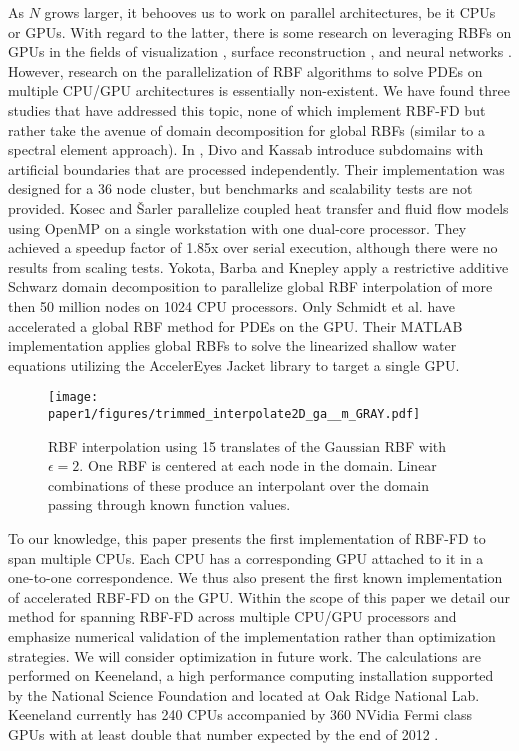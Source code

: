 As $N$ grows larger, it behooves us to work on parallel architectures, be it CPUs or GPUs. With regard to the latter, there is some research on leveraging RBFs on GPUs in the fields of visualization \cite{Cuntz2007,Weiler2005},  surface reconstruction \cite{Corrigan2005,Carr2003}, and neural networks \cite{Brandstetter2008}. However, research on the parallelization of RBF algorithms to solve PDEs on multiple CPU/GPU architectures is essentially non-existent. We have found three studies that have addressed this topic, none of which implement RBF-FD but rather take the avenue of domain decomposition for global RBFs (similar to a spectral element approach). In \cite{Divo2007}, Divo and Kassab introduce subdomains with artificial boundaries that are processed independently. Their implementation was designed for a 36 node cluster, but benchmarks and scalability tests are not provided. Kosec and \v{S}arler \cite{Kosec2008} parallelize coupled heat transfer and fluid flow models using OpenMP on a single workstation with one dual-core processor. They achieved a speedup factor of 1.85x over serial execution, although there were
no results from scaling tests. Yokota, Barba and Knepley \cite{Yokota2010} apply a restrictive additive Schwarz domain decomposition to parallelize global RBF interpolation of more then 50 million nodes on 1024 CPU processors. Only Schmidt et al. \cite{Schmidt2009b} have accelerated a global RBF method for PDEs on the GPU. Their MATLAB implementation applies global RBFs to solve the linearized shallow water equations utilizing the AccelerEyes Jacket \cite{JacketGuide2009} library to target a single GPU.

\begin{figure}[t]
    \centering
    \texttt{[image: paper1/figures/trimmed\_interpolate2D\_ga\_\_m\_GRAY.pdf]}
    \caption{RBF interpolation using 15 translates of the Gaussian RBF with $\epsilon=2$. One RBF is centered at each node in the domain. Linear
    combinations of these produce an interpolant over the domain passing through known function values. }
    \label{fig:rbfInterpolation}
\end{figure}

To our knowledge, this paper presents the first implementation of RBF-FD 
to span multiple CPUs. Each CPU has a corresponding GPU attached to it
in a one-to-one correspondence. We thus also present the first known 
implementation of accelerated RBF-FD on the GPU. Within the scope of this paper we detail our method for spanning RBF-FD across multiple CPU/GPU processors and emphasize numerical validation of the implementation rather than optimization strategies. We will consider optimization in future work. The calculations are performed on Keeneland, a high performance computing installation supported by the National Science Foundation and located at Oak Ridge National Lab. Keeneland currently has 240 CPUs accompanied by 360 NVidia Fermi class GPUs with at least double that number expected by the end of 2012 \cite{Vetter2011}.

